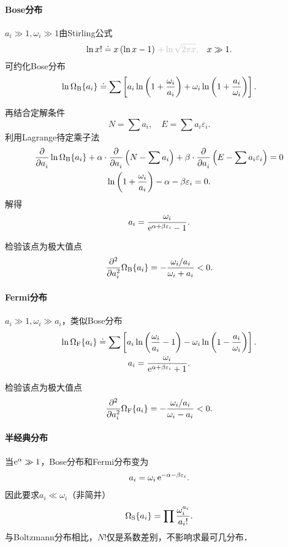 \paragraph{Bose分布}
$a_i\gg 1,\omega_i\gg 1$由Stirling公式
\[
	\ln x!\doteq x\kh{\ln x-1}\,{\color{lightgray}+\ln\sqrt{2\pi x},}\quad x\gg 1.
\]
可约化Bose分布
\begin{align*}
	\ln\Om[B]\doteq\sum\fkh{a_i\ln\kh{1+\frac{\omega_i}{a_i}}+\omega_i\ln\kh{1+\frac{a_i}{\omega_i}}}.
\end{align*}

再结合定解条件
\[
	N=\sum a_i,\quad E=\sum a_i\varepsilon_i.
\]
利用Lagrange待定乘子法
\begin{gather*}
	\pp{a_i}\ln\Om[B]+\alpha\cdot\pp{a_i}\kh{N-\sum a_i}+\beta\cdot\pp{a_i}\kh{E-\sum a_i\varepsilon_i}=0\\
	\ln\kh{1+\frac{\omega_i}{a_i}}-\alpha-\beta\ve_i=0.
\end{gather*}
解得
\begin{align}
	a_i=\frac{\omega_i}{\e{\alpha+\beta\varepsilon_i}-1}.
\end{align}

检验该点为极大值点
\[
	\pp[2]{a_i}\Om[B]=-\frac{\omega_i/a_i}{\omega_i+a_i}<0.
\]
\paragraph{Fermi分布}
$a_i\gg 1,\omega_i\gg a_i$，类似Bose分布
\begin{gather}\notag
	\ln\Om[F]\doteq\sum\fkh{a_i\ln\kh{\frac{\omega_i}{a_i}-1}-\omega_i\ln\kh{1-\frac{a_i}{\omega_i}}}.\\
	a_i=\frac{\omega_i}{\e{\alpha+\beta\varepsilon_i}+1}.
\end{gather}


检验该点为极大值点
\[
	\pp[2]{a_i}\Om[F]=-\frac{\omega_i/a_i}{\omega_i-a_i}<0.
\]
\paragraph*{半经典分布}
当$\e\alpha\gg 1$，Bose分布和Fermi分布变为
\begin{align}
	a_i=\omega_i\e{-\alpha-\beta\varepsilon_i}.
\end{align}
因此要求$a_i\ll\omega_i$（非简并）
\begin{align}
	\Om[S]=\prod\frac{\omega_i^{a_i}}{a_i!}.
\end{align}
与Boltzmann分布相比，$N!$仅是系数差别，不影响求最可几分布．
